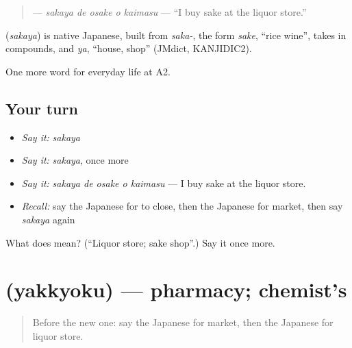 \begin{quote}
\textbf{  } — \emph{sakaya de osake o kaimasu} — \textquotedblleft{}I buy sake at the liquor store.\textquotedblright{}
\end{quote}

\begin{cousinweb}
\textbf{} (\emph{sakaya}) is native Japanese, built from \emph{saka-}, the form \emph{sake}, \textquotedblleft{}rice wine\textquotedblright{}, takes in compounds, and \emph{ya}, \textquotedblleft{}house, shop\textquotedblright{} (JMdict, KANJIDIC2).
\end{cousinweb}

\begin{grammarlens}[title={What you've built}]
One more word for everyday life at A2.
\end{grammarlens}

\subsection*{Your turn}
\begin{itemize}
\raggedright
  \item \emph{Say it:} \emph{sakaya}
  \item \emph{Say it:} \emph{sakaya}, once more
  \item \emph{Say it:} \emph{sakaya de osake o kaimasu} — I buy sake at the liquor store.
  \item \emph{Recall:} say the Japanese for to close, then the Japanese for market, then say \emph{sakaya} again
\end{itemize}

\begin{tcolorbox}[breakable,colback=teal!4,colframe=teal!35!black,title={Before you move on}]
What does  mean? (\textquotedblleft{}Liquor store; sake shop\textquotedblright{}.) Say it once more.
\end{tcolorbox}
\section[\texorpdfstring{\ja{やっきょく} (yakkyoku)}{やっきょく (yakkyoku)}]{ (yakkyoku) — pharmacy; chemist's}

\label{lesson:JA-C191-yakkyoku}



\begin{quote}
Before the new one: say the Japanese for market, then the Japanese for liquor store.
\end{quote}

